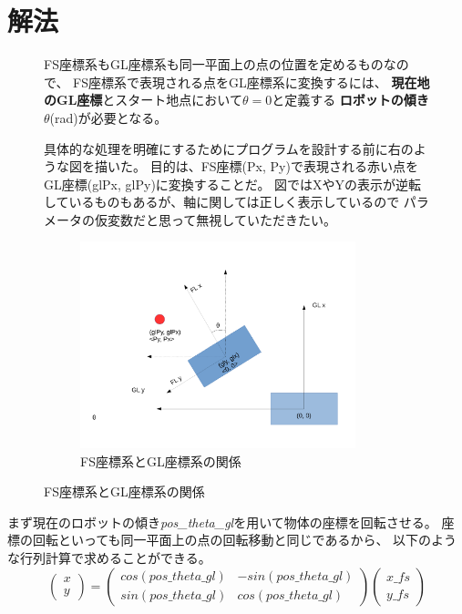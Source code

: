 \documentclass[main]{subfiles}
\begin{document}
\section{解法}
\begin{figure}[H]
	\begin{minipage}{0.5\hsize}
		\setlength{\parindent}{1\Cwd}
		FS座標系もGL座標系も同一平面上の点の位置を定めるものなので、
		FS座標系で表現される点をGL座標系に変換するには、
		\textbf{現在地のGL座標}とスタート地点において$\theta = 0$と定義する
		\textbf{ロボットの傾き$\theta$}(rad)が必要となる。

		具体的な処理を明確にするためにプログラムを設計する前に右のような図を描いた。
		目的は、FS座標(Px, Py)で表現される赤い点をGL座標(glPx, glPy)に変換することだ。
		図ではXやYの表示が逆転しているものもあるが、軸に関しては正しく表示しているので
		パラメータの仮変数だと思って無視していただきたい。
	\end{minipage}
	\begin{minipage}{0.5\hsize}
		\begin{figure}[H]
			\centering
			\includegraphics[width=8cm]{img/trans.pdf}
			\caption{FS座標系とGL座標系の関係}
		\end{figure}
	\end{minipage}
\end{figure}

まず現在のロボットの傾き\textit{pos\_theta\_gl}を用いて物体の座標を回転させる。
座標の回転といっても同一平面上の点の回転移動と同じであるから、
以下のような行列計算で求めることができる。
\[
	\left(
	\begin{array}{cc}
		x \\
		y
	\end{array}
	\right)
	=
	\left(
	\begin{array}{cc}
		cos(pos\_theta\_gl) & -sin(pos\_theta\_gl) \\
		sin(pos\_theta\_gl) & cos(pos\_theta\_gl)
	\end{array}
	\right)
	\left(
	\begin{array}{c}
		x\_fs \\
		y\_fs
	\end{array}
	\right)
\]
\end{document}
